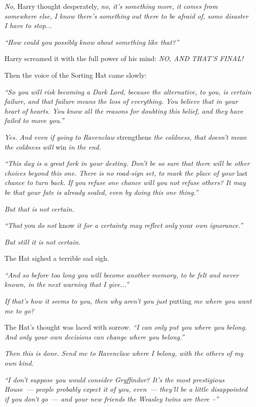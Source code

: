 \emph{No,} Harry thought desperately, \emph{no, it's something more, it comes from somewhere else, I know there's something out there to be afraid of, some disaster I have to stop...}

\emph{``How could you possibly know about something like that?''}

Harry screamed it with the full power of his mind: \emph{NO, AND THAT'S FINAL!}

Then the voice of the Sorting Hat came slowly:

\emph{``So you will risk becoming a Dark Lord, because the alternative, to you, is certain failure, and that failure means the loss of everything. You believe that in your heart of hearts. You know all the reasons for doubting this belief, and they have failed to move you.''}

\emph{Yes. And even if going to Ravenclaw} strengthens \emph{the coldness, that doesn't mean the coldness will} win \emph{in the end.}

\emph{``This day is a great fork in your destiny. Don't be so sure that there will be other choices beyond this one. There is no road-sign set, to mark the place of your} last \emph{chance to turn back. If you refuse one chance will you not refuse others? It may be that your fate is already sealed, even by doing this one thing.''}

\emph{But that is not certain.}

\emph{``That} you \emph{do not} know \emph{it for a certainty may reflect only} your \emph{own ignorance.''}

\emph{But still it is not certain.}

The Hat sighed a terrible sad sigh.

\emph{``And so before too long you will become another memory, to be felt and never known, in the next warning that I give...''}

\emph{If that's how it seems to you, then why aren't you just} putting \emph{me where you want me to go?}

The Hat's thought was laced with sorrow. \emph{``I can only put you where you belong. And only your own decisions can change where you belong.''}

\emph{Then this is done. Send me to Ravenclaw where I belong, with the others of my own kind.}

\emph{``I don't suppose you would consider Gryffindor? It's the most prestigious House~--- people probably expect it of you, even~--- they'll be a little disappointed if you don't go~--- and your new friends the Weasley twins are there~-''}

